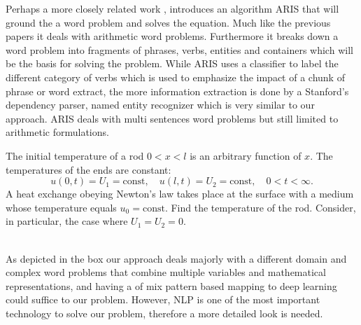 Perhaps a more closely related work \parencite{hosseini2014learning}, introduces an algorithm ARIS that will ground the a word problem and solves the equation. Much like the previous papers it deals with arithmetic word problems. Furthermore it breaks down a word problem into fragments of phrases, verbs, entities and containers which will be the basis for solving the problem. While ARIS uses a classifier to label the different category of verbs which is used to emphasize the impact of a chunk of phrase or word extract, the more information extraction is done by a Stanford’s dependency parser, named entity recognizer which is very similar to our approach. ARIS deals with multi sentences word problems but still limited to arithmetic formulations.\\
\par

\begin{tcolorbox}
The initial temperature of a rod $0<x<l$ is an arbitrary function of $x$. The temperatures of the ends are constant:
\begin{equation*}
u(0,t) = U_{1} = \mathrm{const}, \quad u(l,t) = U_{2} = \mathrm{const}, \quad 0<t<\infty.
\end{equation*}
A heat exchange obeying Newton's law takes place at the surface with a medium whose temperature equals $u_{0}=\mathrm{const}$. Find the temperature of the rod. Consider, in particular, the case where $U_{1}=U_{2}=0$.
\end{tcolorbox}\\
As depicted in the box our approach deals majorly with a different domain and complex word problems that combine multiple variables and mathematical representations, and having a of mix pattern based mapping to deep learning could suffice to our problem. However, NLP is one of the most important technology to solve our problem, therefore a more detailed look is needed.
